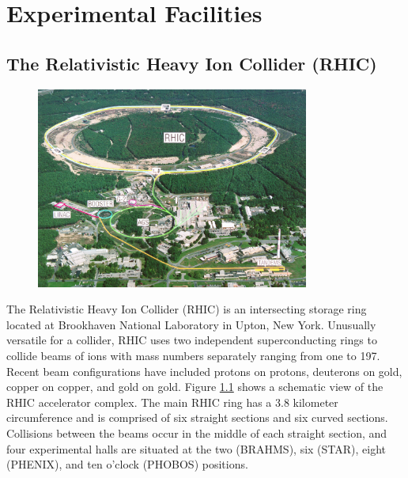 \chapter{Experimental Facilities}

\section{The Relativistic Heavy Ion Collider (RHIC)}

\begin{figure}
  \begin{center}
    \includegraphics[width=0.8\textwidth]{figures/rhic-from-above}
  \end{center}
  \caption{}
  \label{fig:rhic}
\end{figure}

The Relativistic Heavy Ion Collider (RHIC) is an intersecting storage ring located at Brookhaven National Laboratory in Upton, New York.  Unusually versatile for a collider, RHIC uses two independent superconducting rings to collide beams of ions with mass numbers separately ranging from one to 197.  Recent beam configurations have included protons on protons, deuterons on gold, copper on copper, and gold on gold.  Figure \ref{fig:rhic} shows a schematic view of the RHIC accelerator complex.  The main RHIC ring has a 3.8 kilometer circumference and is comprised of six straight sections and six curved sections.  Collisions between the beams occur in the middle of each straight section, and four experimental halls are situated at the two (BRAHMS), six (STAR), eight (PHENIX), and ten o'clock (PHOBOS) positions.

